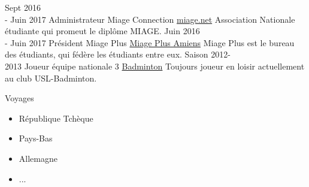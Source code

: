 \documentclass[letterpaper]{twentysecondcv} %
\begin{document}
\begin{twenty} %
	\twentyitem
    	{Sept 2016\\- Juin 2017}
        {Administrateur Miage Connection}
        {\href{https://www.miage.net/}{miage.net}}
        {}
        {Association Nationale étudiante qui promeut le diplôme MIAGE.}
    \twentyitem
    	{Juin 2016\\- Juin 2017}
        {Président Miage Plus}
        {\href{https://www.facebook.com/miageplusamiens/}{Miage Plus Amiens}}
        {}
        {Miage Plus est le bureau des étudiants, qui fédère les étudiants entre eux. }
     \twentyitem
    	{Saison 2012-\\ 2013}
        {Joueur équipe nationale 3}
        {\href{http://usl-badminton.fr/}{Badminton}}
        {}
        {Toujours joueur en loisir actuellement au club USL-Badminton.\\ }

     \twentyitem
    	{}
        {Voyages}
        {}
        {}
       {\begin{itemize}
        	\item République Tchèque
        	\item Pays-Bas
        	\item Allemagne
            \item ...
        \end{itemize}}
        
        
\end{twenty}
\end{document}
